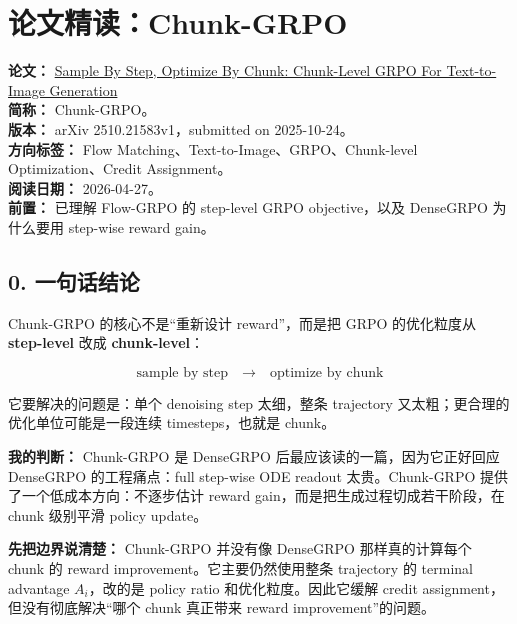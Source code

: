 
\section{论文精读：Chunk-GRPO}

\begin{conceptbox}
\textbf{论文：} \href{https://arxiv.org/abs/2510.21583}{Sample By Step, Optimize By Chunk: Chunk-Level GRPO For Text-to-Image Generation}\\
\textbf{简称：} Chunk-GRPO。\\
\textbf{版本：} arXiv 2510.21583v1，submitted on 2025-10-24。\\
\textbf{方向标签：} Flow Matching、Text-to-Image、GRPO、Chunk-level Optimization、Credit Assignment。\\
\textbf{阅读日期：} 2026-04-27。\\
\textbf{前置：} 已理解 Flow-GRPO 的 step-level GRPO objective，以及 DenseGRPO 为什么要用 step-wise reward gain。
\end{conceptbox}

\subsection{0. 一句话结论}

Chunk-GRPO 的核心不是“重新设计 reward”，而是把 GRPO 的优化粒度从 \textbf{step-level} 改成 \textbf{chunk-level}：

\[
\text{sample by step}
\quad \rightarrow \quad
\text{optimize by chunk}
\]

它要解决的问题是：单个 denoising step 太细，整条 trajectory 又太粗；更合理的优化单位可能是一段连续 timesteps，也就是 chunk。

\begin{summarybox}
\textbf{我的判断：} Chunk-GRPO 是 DenseGRPO 后最应该读的一篇，因为它正好回应 DenseGRPO 的工程痛点：full step-wise ODE readout 太贵。Chunk-GRPO 提供了一个低成本方向：不逐步估计 reward gain，而是把生成过程切成若干阶段，在 chunk 级别平滑 policy update。
\end{summarybox}

\begin{warnbox}
\textbf{先把边界说清楚：} Chunk-GRPO 并没有像 DenseGRPO 那样真的计算每个 chunk 的 reward improvement。它主要仍然使用整条 trajectory 的 terminal advantage \(A_i\)，改的是 policy ratio 和优化粒度。因此它缓解 credit assignment，但没有彻底解决“哪个 chunk 真正带来 reward improvement”的问题。
\end{warnbox}

